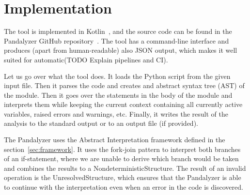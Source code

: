 \section{Implementation}

The tool is implemented in Kotlin~\cite{kotlinDocs}, and the source code can be found in the Pandalyzer GitHub
repository~\cite{pandalyzer}.
The tool has a command-line interface and produces (apart from human-readable) also JSON output, which makes it well
suited for automatic(TODO Explain pipelines and CI).

Let us go over what the tool does.
It loads the Python script from the given input file.
Then it parses the code and creates and abstract syntax tree (AST) of the module.
Then it goes over the statements in the body of the module and interprets them while keeping the current context
containing all currently active variables, raised errors and warnings, etc.
Finally, it writes the result of the analysis to the standard output or to an output file (if provided).

The Pandalyzer uses the Abstract Interpretation framework defined in the section~\ref{sec:framework}.
It uses the fork-join pattern to interpret both branches of an if-statement, where we are unable to derive which branch
would be taken and combines the results to a NondeterministicStructure.
The result of an invalid operation is the UnresolvedStructure, which ensures that the Pandalyzer is able to continue
with the interpretation even when an error in the code is discovered.

